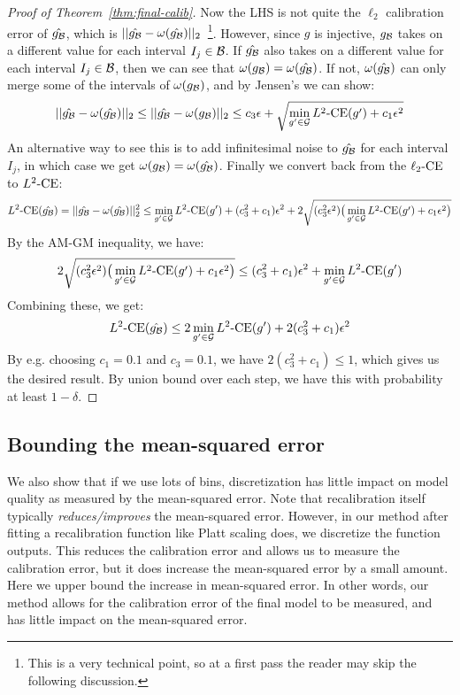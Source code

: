 \begin{proof}[Proof of Theorem~\ref{thm:final-calib}]
Now the LHS is not quite the $\ell_2$ calibration error of $\hat{g_{\mathcal{B}{}}}$, which is $||\hat{g_{\mathcal{B}{}}} - \omega(\hat{g_{\mathcal{B}{}}})||_2$~\footnote{This is a very technical point, so at a first pass the reader may skip the following discussion.}.
However, since $g$ is injective, $g_{\mathcal{B}{}}$ takes on a different value for each interval $I_j \in \mathcal{B}{}$.
If $\hat{g_{\mathcal{B}{}}}$ also takes on a different value for each interval $I_j \in \mathcal{B}{}$, then we can see that $\omega(g_{\mathcal{B}{}}) = \omega(\hat{g_{\mathcal{B}{}}})$.
If not, $\omega(\hat{g_{\mathcal{B}{}}})$ can only merge some of the intervals of $\omega(g_{\mathcal{B}{}})$, and by Jensen's we can show:
\[ ||\hat{g_{\mathcal{B}{}}} - \omega(\hat{g_{\mathcal{B}{}}})||_2 \leq ||\hat{g_{\mathcal{B}{}}} - \omega(g_{\mathcal{B}{}})||_2 \leq c_3 \epsilon + \sqrt{\min_{g' \in \mathcal{G}{}}L^2\textup{-CE}(g') + c_1 \epsilon^2} \]
An alternative way to see this is to add infinitesimal noise to $\hat{g_{\mathcal{B}{}}}$ for each interval $I_j$, in which case we get $\omega(g_{\mathcal{B}{}}) = \omega(\hat{g_{\mathcal{B}{}}})$.
Finally we convert back from the $\ell_2\textup{-CE}$ to $L^2\textup{-CE}$:
\[ L^2\textup{-CE}(\hat{g_{\mathcal{B}{}}}) = ||\hat{g_{\mathcal{B}{}}} - \omega(\hat{g_{\mathcal{B}{}}})||_2^2 \leq \min_{g' \in \mathcal{G}{}}L^2\textup{-CE}(g') + (c_3^2 + c_1) \epsilon^2 + 2\sqrt{(c_3^2 \epsilon^2) \big(\min_{g' \in \mathcal{G}{}}L^2\textup{-CE}(g') + c_1 \epsilon^2\big)} \]
By the AM-GM inequality, we have:
\[ 2\sqrt{(c_3^2 \epsilon^2) \big(\min_{g' \in \mathcal{G}{}}L^2\textup{-CE}(g') + c_1 \epsilon^2\big)} \leq (c_3^2 + c_1) \epsilon^2 + \min_{g' \in \mathcal{G}{}}L^2\textup{-CE}(g') \]
Combining these, we get:
\[ L^2\textup{-CE}(\hat{g_{\mathcal{B}{}}}) \leq 2 \min_{g' \in \mathcal{G}{}}L^2\textup{-CE}(g') + 2(c_3^2 + c_1) \epsilon^2 \]
By e.g. choosing $c_1 = 0.1$ and $c_3 = 0.1$, we have $2(c_3^2 + c_1) \leq 1$, which gives us the desired result. By union bound over each step, we have this with probability at least $1 - \delta$.


\end{proof}

\subsection{Bounding the mean-squared error}

We also show that if we use lots of bins, discretization has little impact on model quality as measured by the mean-squared error.
Note that recalibration itself typically \emph{reduces/improves} the mean-squared error.
However, in our method after fitting a recalibration function like Platt scaling does, we discretize the function outputs.
This reduces the calibration error and allows us to measure the calibration error, but it does increase the mean-squared error by a small amount.
Here we upper bound the increase in mean-squared error.
In other words, our method allows for the calibration error of the final model to be measured, and has little impact on the mean-squared error.

